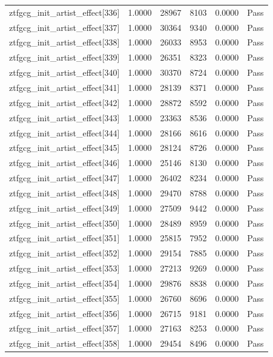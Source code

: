\begin{table}[htbp]
\begin{tabular}{llrrll}
ztfgcg\_init\_artist\_effect[336] & 1.0000 & 28967 & 8103 & 0.0000 & Pass \\
ztfgcg\_init\_artist\_effect[337] & 1.0000 & 30364 & 9340 & 0.0000 & Pass \\
ztfgcg\_init\_artist\_effect[338] & 1.0000 & 26033 & 8953 & 0.0000 & Pass \\
ztfgcg\_init\_artist\_effect[339] & 1.0000 & 26351 & 8323 & 0.0000 & Pass \\
ztfgcg\_init\_artist\_effect[340] & 1.0000 & 30370 & 8724 & 0.0000 & Pass \\
ztfgcg\_init\_artist\_effect[341] & 1.0000 & 28139 & 8371 & 0.0000 & Pass \\
ztfgcg\_init\_artist\_effect[342] & 1.0000 & 28872 & 8592 & 0.0000 & Pass \\
ztfgcg\_init\_artist\_effect[343] & 1.0000 & 23363 & 8536 & 0.0000 & Pass \\
ztfgcg\_init\_artist\_effect[344] & 1.0000 & 28166 & 8616 & 0.0000 & Pass \\
ztfgcg\_init\_artist\_effect[345] & 1.0000 & 28124 & 8726 & 0.0000 & Pass \\
ztfgcg\_init\_artist\_effect[346] & 1.0000 & 25146 & 8130 & 0.0000 & Pass \\
ztfgcg\_init\_artist\_effect[347] & 1.0000 & 26402 & 8234 & 0.0000 & Pass \\
ztfgcg\_init\_artist\_effect[348] & 1.0000 & 29470 & 8788 & 0.0000 & Pass \\
ztfgcg\_init\_artist\_effect[349] & 1.0000 & 27509 & 9442 & 0.0000 & Pass \\
ztfgcg\_init\_artist\_effect[350] & 1.0000 & 28489 & 8959 & 0.0000 & Pass \\
ztfgcg\_init\_artist\_effect[351] & 1.0000 & 25815 & 7952 & 0.0000 & Pass \\
ztfgcg\_init\_artist\_effect[352] & 1.0000 & 29154 & 7885 & 0.0000 & Pass \\
ztfgcg\_init\_artist\_effect[353] & 1.0000 & 27213 & 9269 & 0.0000 & Pass \\
ztfgcg\_init\_artist\_effect[354] & 1.0000 & 29876 & 8838 & 0.0000 & Pass \\
ztfgcg\_init\_artist\_effect[355] & 1.0000 & 26760 & 8696 & 0.0000 & Pass \\
ztfgcg\_init\_artist\_effect[356] & 1.0000 & 26715 & 9181 & 0.0000 & Pass \\
ztfgcg\_init\_artist\_effect[357] & 1.0000 & 27163 & 8253 & 0.0000 & Pass \\
ztfgcg\_init\_artist\_effect[358] & 1.0000 & 29454 & 8496 & 0.0000 & Pass \\

\end{tabular}
\end{table}
